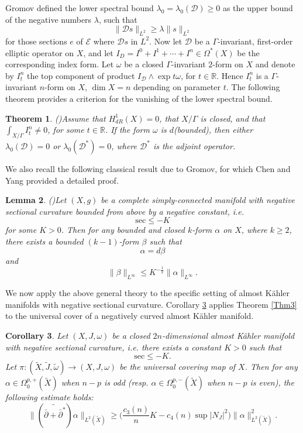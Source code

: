 \documentclass[12pt, twoside]{article}
\newtheorem{theorem}{Theorem}[section]
\newtheorem{corollary}[theorem]{Corollary}
\newtheorem{lemma}[theorem]{Lemma}
\theoremstyle{definition}
\numberwithin{equation}{section}
\def \a {\alpha }
\def \b {\beta}
\def \la {\lambda}
\def\w {\omega}
\def\Om{\Omega}
\def\Ga{\Gamma}
\begin{document}
Gromov defined the lower spectral bound $\la_{0}=\la_{0}(\mathcal{D})\geq 0$ as the upper bound of the negative numbers $\la$, such that 
\[\|\mathcal{D}s\|_{L^{2}}\geq\la\|s\|_{L^{2}} \]
for those sections $e$ of $\mathcal{E}$ where $\mathcal{D}s$ in $L^{2}$. 
Now let $\mathcal{D}$ be a $\Ga$-invariant, first-order elliptic operator on $X$, 
and let $I_{D}=I^{0}+I^{1}+\cdots+I^{n}\in\Om^{\ast}(X)$ be the corresponding index form. 
Let $\w$ be a closed $\Ga$-invariant $2$-form on $X$ and denote by $I_{t}^{n}$ the top component of product $I_{\mathcal{D}}\wedge\exp{t\w}$, 
for $t\in\mathbb{R}$. Hence $I_{t}^{n}$ is a $\Ga$-invariant $n$-form on $X$, $\dim X=n$ depending on parameter $t$.  The following theorem provides a criterion for the vanishing of the lower spectral bound.
\begin{theorem}(\cite[2.4.A. Theorem]{Gro})\label{Thm4}
	Assume that $H^{1}_{dR}(X)=0$, that $X/\Ga$ is closed, and that $\int_{X/\Ga}I_{t}^{n}\neq 0$, for some $t\in\mathbb{R}$. 
	If the form $\w$ is $d$(bounded), then either $\la_{0}(\mathcal{D})=0$ or $\la_{0}(\mathcal{D}^{\ast})=0$,
	where $\mathcal{D}^{\ast}$ is the adjoint operator.
\end{theorem}
We also recall the following classical result due to Gromov, for which Chen and Yang provided a detailed proof.
\begin{lemma}(\cite[Lemma 3.2]{CY})\label{L7}
	Let $(X,g)$ be a complete simply-connected manifold with negative sectional curvature bounded from above by a negative constant, i.e.
	$$\mathrm{sec}\leq -K$$
	for some $K>0$. Then for any bounded and closed $k$-form $\a$ on $X$, where $k\geq2$, there exists a bounded $(k-1)$-form $\b$ such that 
	$$\a=d\b$$
	and
	\[ \|\b\|_{L^{\infty}}\leq K^{-\frac{1}{2}}\|\a\|_{L^{\infty}}.\]
\end{lemma}
We now apply the above general theory to the specific setting of almost Kähler manifolds with negative sectional curvature. Corollary \ref{C5} applies Theorem \ref{Thm3} to the universal cover of a negatively curved almost Kähler manifold. 
\begin{corollary}\label{C5}
	Let $(X,J,\w)$ be a closed $2n$-dimensional almost K\"{a}hler manifold with  negative sectional curvature,
	i.e. there exists a constant $K>0$ such that \[ \mathrm{sec}\leq -K.\]
	Let $\pi:(\tilde{X},\tilde{J},\tilde{\w})\rightarrow(X,J,\w)$ be the universal covering map of $X$.  
	Then for any $\a\in\Om_{0}^{p,+}(\tilde{X})$ when $n-p$ is odd (resp. $\a\in\Om_{0}^{p,-}(\tilde{X})$ when $n-p$ is even),
	the following estimate holds:
	\[\|(\widetilde{\bar{\partial}+\bar{\partial}^{\ast}})\a\|_{L^{2}(\tilde{X})}\geq \Big(\frac{c_{3}(n)}{n}K-c_{4}(n)\sup|N_{J}|^{2}\Big)\|\a\|^{2}_{L^{2}(\tilde{X})}. \]
\end{corollary}
\end{document}
